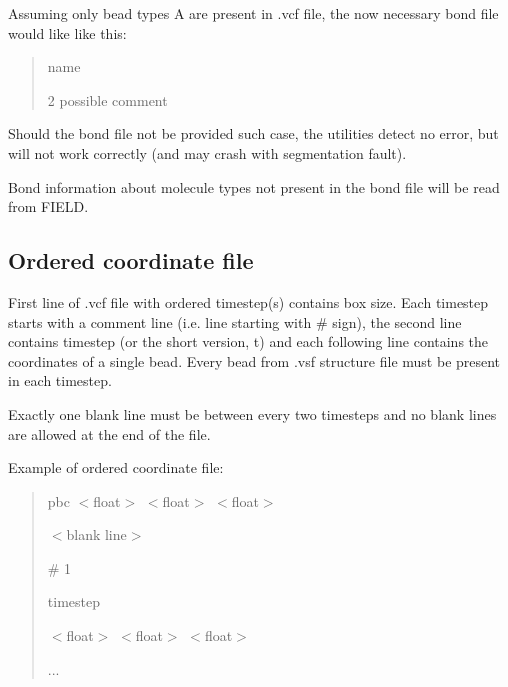 Assuming only bead types {\ttfamily A} are present in {\ttfamily .vcf} file, the now necessary bond file would like like this\+:

\begin{quote}
{\ttfamily name}

{}

{ 2 possible comment} \end{quote}


Should the bond file not be provided such case, the utilities detect no error, but will not work correctly (and may crash with segmentation fault).

Bond information about molecule types not present in the bond file will be read from {\ttfamily F\+I\+E\+LD}.\hypertarget{InputFiles_OrderedCoorFile}{}\subsection{Ordered coordinate file }\label{InputFiles_OrderedCoorFile}
First line of {\ttfamily .vcf} file with ordered timestep(s) contains box size. Each timestep starts with a comment line (i.\+e. line starting with {\ttfamily \#} sign), the second line contains {\ttfamily timestep} (or the short version, {\ttfamily t}) and each following line contains the coordinates of a single bead. Every bead from {\ttfamily .vsf} structure file must be present in each timestep.

Exactly one blank line must be between every two timesteps and no blank lines are allowed at the end of the file.

Example of ordered coordinate file\+:

\begin{quote}
{\ttfamily pbc $<$float$>$ $<$float$>$ $<$float$>$}

{\ttfamily $<$blank line$>$}

{\ttfamily \# 1}

{\ttfamily timestep}

{\ttfamily $<$float$>$ $<$float$>$ $<$float$>$}

{\ttfamily ...} \end{quote}


